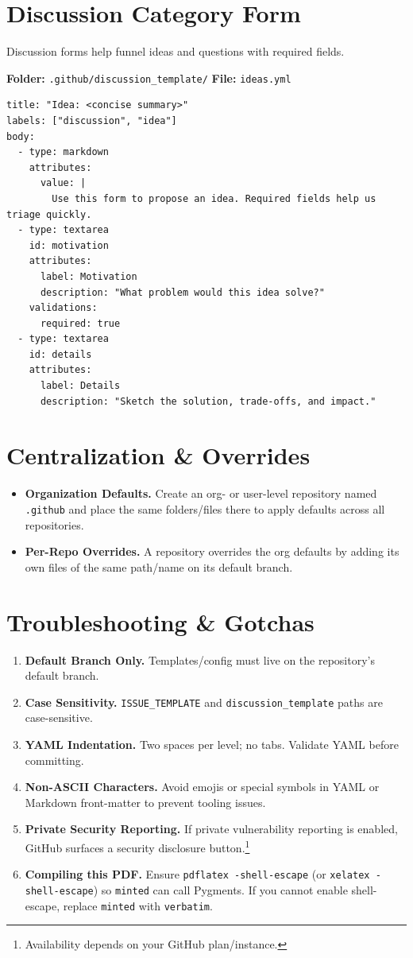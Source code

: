 \documentclass[11pt]{article}
\begin{document}
\section{Discussion Category Form}
Discussion forms help funnel ideas and questions with required fields.

\noindent\textbf{Folder:} \texttt{.github/discussion\_template/}\quad
\textbf{File:} \texttt{ideas.yml}
\begin{verbatim}
title: "Idea: <concise summary>"
labels: ["discussion", "idea"]
body:
  - type: markdown
    attributes:
      value: |
        Use this form to propose an idea. Required fields help us triage quickly.
  - type: textarea
    id: motivation
    attributes:
      label: Motivation
      description: "What problem would this idea solve?"
    validations:
      required: true
  - type: textarea
    id: details
    attributes:
      label: Details
      description: "Sketch the solution, trade-offs, and impact."
\end{verbatim}

\section{Centralization \& Overrides}
\begin{itemize}
  \item \textbf{Organization Defaults.} Create an org- or user-level repository named \texttt{.github} and place the same folders/files there to apply defaults across all repositories.
  \item \textbf{Per-Repo Overrides.} A repository overrides the org defaults by adding its own files of the same path/name on its default branch.
\end{itemize}

\section{Troubleshooting \& Gotchas}
\begin{enumerate}
  \item \textbf{Default Branch Only.} Templates/config must live on the repository's default branch.
  \item \textbf{Case Sensitivity.} \nolinkurl{ISSUE_TEMPLATE} and \nolinkurl{discussion_template} paths are case-sensitive.
  \item \textbf{YAML Indentation.} Two spaces per level; no tabs. Validate YAML before committing.
  \item \textbf{Non-ASCII Characters.} Avoid emojis or special symbols in YAML or Markdown front-matter to prevent tooling issues.
  \item \textbf{Private Security Reporting.} If private vulnerability reporting is enabled, GitHub surfaces a security disclosure button.\footnote{Availability depends on your GitHub plan/instance.}
  \item \textbf{Compiling this PDF.} Ensure \texttt{pdflatex -shell-escape} (or \texttt{xelatex -shell-escape}) so \texttt{minted} can call Pygments. If you cannot enable shell-escape, replace \texttt{minted} with \texttt{verbatim}.
\end{enumerate}
\end{document}
